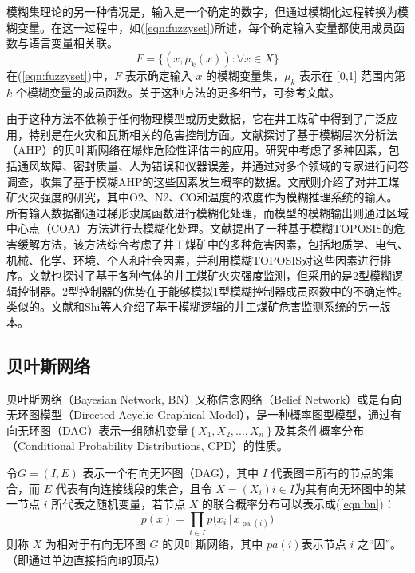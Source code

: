 \documentclass[lang=cn,a4paper,citestyle=gb7714-2015, bibstyle=gb7714-2015]{elegantpaper}
\newcommand{\mycite}[1]{\textsuperscript{\parencite{#1}}}
\begin{document}
    模糊集理论的另一种情况是，输入是一个确定的数字，但通过模糊化过程转换为模糊变量。在这一过程中，如(\ref{eqn:fuzzyset})所述，每个确定输入变量都使用成员函数与语言变量相关联。
    \begin{equation}
        F =  \{(x, \mu_k(x)) : \forall x \in X\}
        \label{eqn:fuzzyset}
    \end{equation}
    在(\ref{eqn:fuzzyset})中，$F$ 表示确定输入 $x$ 的模糊变量集，$\mu_k$ 表示在 [0,1] 范围内第 $k$ 个模糊变量的成员函数。关于这种方法的更多细节，可参考文献\mycite{Muduli2018a}。

    \bigskip
    由于这种方法不依赖于任何物理模型或历史数据，它在井工煤矿中得到了广泛应用，特别是在火灾和瓦斯相关的危害控制方面。文献\mycite{Li2020}探讨了基于模糊层次分析法（AHP）的贝叶斯网络在爆炸危险性评估中的应用。研究中考虑了多种因素，包括通风故障、密封质量、人为错误和仪器误差，并通过对多个领域的专家进行问卷调查，收集了基于模糊AHP的这些因素发生概率的数据。文献\mycite{Danish2020}则介绍了对井工煤矿火灾强度的研究，其中O2、N2、CO和温度的浓度作为模糊推理系统的输入。所有输入数据都通过梯形隶属函数进行模糊化处理，而模型的模糊输出则通过区域中心点（COA）方法进行去模糊化处理。文献\mycite{Mahdevari2014}提出了一种基于模糊TOPOSIS的危害缓解方法，该方法综合考虑了井工煤矿中的多种危害因素，包括地质学、电气、机械、化学、环境、个人和社会因素，并利用模糊TOPOSIS对这些因素进行排序。文献\mycite{Basu2019}也探讨了基于各种气体的井工煤矿火灾强度监测，但采用的是2型模糊逻辑控制器。2型控制器的优势在于能够模拟1型模糊控制器成员函数中的不确定性。类似的。文献\mycite{Brodny2022}和Shi等人\mycite{Shi2018}介绍了基于模糊逻辑的井工煤矿危害监测系统的另一版本。


    \subsection{贝叶斯网络}
    贝叶斯网络（Bayesian Network, BN）又称信念网络（Belief Network）或是有向无环图模型（Directed Acyclic Graphical Model），是一种概率图型模型，通过有向无环图（DAG）表示一组随机变量$\left\{X_{1},X_{2},...,X_{n}\right\}$及其条件概率分布（Conditional Probability Distributions, CPD）的性质。

    令$G = (I,E)$ 表示一个有向无环图（DAG），其中 $I$ 代表图中所有的节点的集合，而 $E$ 代表有向连接线段的集合，且令 $X = (X_i)i\in I$为其有向无环图中的某一节点 $i$ 所代表之随机变量，若节点 $X$ 的联合概率分布可以表示成(\ref{eqn:bn})：
    \begin{equation}
        p(x)=\prod _{i\in I}p{\big (}x_{i}\,{\big |}\,x_{\operatorname {pa} (i)}{\big )}
        \label{eqn:bn}
    \end{equation}
    则称 $X$ 为相对于有向无环图 $G$ 的贝叶斯网络，其中
    $pa(i)$表示节点 $i$ 之“因”。（即通过单边直接指向i的顶点）
\end{document}
